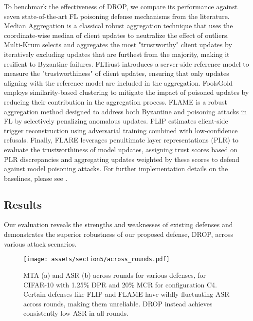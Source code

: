  To benchmark the effectiveness of DROP, we compare its performance against seven state-of-the-art  FL poisoning defense mechanisms from the literature. Median Aggregation \citep{yin2018byzantine} is a classical robust aggregation technique that uses the coordinate-wise median of client updates to neutralize the effect of outliers. Multi-Krum \citep{blanchard2017machine} selects and aggregates the most "trustworthy" client updates by iteratively excluding updates that are furthest from the majority, making it resilient to Byzantine failures. FLTrust \citep{cao2021fltrust} introduces a server-side reference model to measure the "trustworthiness" of client updates, ensuring that only updates aligning with the reference model are included in the aggregation. FoolsGold \citep{fung2018mitigating} employs similarity-based clustering to mitigate the impact of poisoned updates by reducing their contribution in the aggregation process. FLAME \citep{nguyen2022flame} is a robust aggregation method designed to address both Byzantine and poisoning attacks in FL by selectively penalizing anomalous updates. FLIP \citep{zhang2023flip} estimates client-side trigger reconstruction using adversarial training combined with low-confidence refusals. Finally, FLARE \citep{wang2022flare} leverages penultimate layer representations (PLR) to evaluate the trustworthiness of model updates, assigning trust scores based on PLR discrepancies and aggregating updates weighted by these scores to defend against model poisoning attacks.
%
For further implementation details on the baselines, please see .

\subsection{Results}
\label{sec:results}
Our evaluation reveals the strengths and weaknesses of existing defenses and demonstrates the superior robustness of our proposed defense, DROP, across various attack scenarios.

\begin{figure*}[ht]
    \centering
    \texttt{[image: assets/section5/across\_rounds.pdf]}
    \caption{MTA (a) and ASR (b) across rounds for various defenses, for CIFAR-10 with 1.25\% DPR and 20\% MCR for configuration C4. Certain defenses like FLIP and FLAME have wildly fluctuating ASR across rounds, making them unreliable. DROP instead achieves consistently low ASR in all rounds.}
    \label{fig:multiple_round_progression}
\end{figure*}

